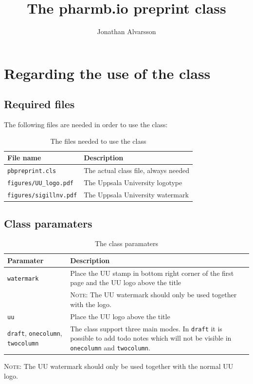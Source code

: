 \documentclass[pharmbio]{pbpreprint}
\begin{document}
\title{The pharm\textcolor{uured}{b.io} preprint class}
\author{Jonathan Alvarsson}
\maketitle
\begin{KeepFromToc}
   \tableofcontents
\end{KeepFromToc}
\section{Regarding the use of the class}
\subsection{Required files}
The following files are needed in order to use the class:

\begin{table}[H]
    \centering
    \caption{The files needed to use the class}
    \begin{tabular}{ll}
    \toprule
    File name & Description \\
    \midrule
    \texttt{pbpreprint.cls} & The actual class file, always needed \\
    \texttt{figures/UU\_logo.pdf} & The Uppsala University logotype \\
    \texttt{figures/sigillnv.pdf} & The Uppsala University watermark \\
    \bottomrule
    \end{tabular}
\end{table}


\subsection{Class paramaters}
\begin{table}[H]
\caption{The class paramaters}
\centering
\begin{tabular}{p{}p{}}
    \toprule
    Paramater & Description \\
    \midrule
    \texttt{watermark} & Place the UU stamp in bottom right corner of the first
                         page and the UU logo above the title \\ 
                       & \textsc{Note}: The UU watermark should only be used
                         together with the logo.\\[10pt]
    \texttt{uu}        & Place the UU logo above the title \\[10pt]
    \texttt{draft}, \texttt{onecolumn}, \texttt{twocolumn} & 
    The class support three main modes. In \texttt{draft} it is possible to add
    todo notes which will not be visible in \texttt{onecolumn} and
    \texttt{twocolumn}. \\
    \bottomrule
\end{tabular}
    \begin{flushleft}
        {\footnotesize \textsc{Note}: The UU watermark should only be used
                                      together with the normal UU logo.}
    \end{flushleft}
\end{table}
\end{document}
